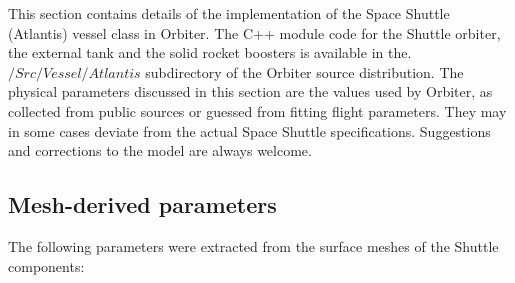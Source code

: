 This section contains details of the implementation of the Space Shuttle (Atlantis) vessel class in Orbiter. The C++ module code for the Shuttle orbiter, the external tank and the solid rocket boosters is available in the.$/Src/Vessel/Atlantis$ subdirectory of the Orbiter source distribution. The physical parameters discussed in this section are the values used by Orbiter, as collected from public sources or guessed from fitting flight parameters. They may in some cases deviate from the actual Space Shuttle specifications. Suggestions and corrections to the model are always welcome.

\break
\subsection{Mesh-derived parameters}
The following parameters were extracted from the surface meshes of the Shuttle components:

